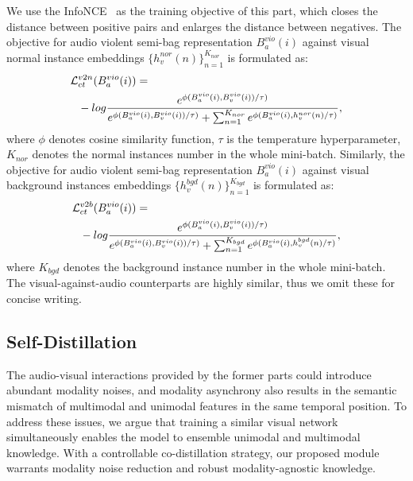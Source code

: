 \documentclass[sigconf]{acmart}
\begin{document}
We use the InfoNCE~\cite{van2018representation} as the training objective of this part, which closes the distance between positive pairs and enlarges the distance between negatives. The objective for audio violent semi-bag representation $B_a^{vio}(i)$ against visual normal instance embeddings $\{h_v^{nor}(n)\}_{n=1}^{K_{nor}}$ is formulated as:
\begin{equation}
\begin{split}
\small
    \mathcal{L}&_{ct}^{v2n}(B_a^{vio}(i)) = \\&-log \frac{e^{\phi(B_a^{vio}(i), B_v^{vio}(i))/\tau)}}{e^{\phi(B_a^{vio}(i), B_v^{vio}(i))/\tau)}+\sum_{n=1}^{K_{nor}}e^{\phi(B_a^{vio}(i), h_v^{nor}(n)/\tau)}},
\end{split}
\end{equation}
where $\phi$ denotes cosine similarity function, $\tau$ is the temperature hyperparameter, $K_{nor}$ denotes the normal instances number in the whole mini-batch. Similarly, the objective for audio violent semi-bag representation $B_a^{vio}(i)$ against visual background instances embeddings $\{h_v^{bgd}(n)\}_{n=1}^{K_{bgd}}$ is formulated as:
\begin{equation}
\begin{split}
\small
    \mathcal{L}&_{ct}^{v2b}(B_a^{vio}(i)) = \\&-log \frac{e^{\phi(B_a^{vio}(i), B_v^{vio}(i))/\tau)}}{e^{\phi(B_a^{vio}(i), B_v^{vio}(i))/\tau)}+\sum_{n=1}^{K_{bgd}}e^{\phi(B_a^{vio}(i), h_v^{bgd}(n)/\tau)}},
\end{split}
\end{equation}
where $K_{bgd}$ denotes the background instance number in the whole mini-batch. The visual-against-audio counterparts are highly similar, thus we omit these for concise writing.

\subsection{Self-Distillation}
The audio-visual interactions provided by the former parts could introduce abundant modality noises, and modality asynchrony also results in the semantic mismatch of multimodal and unimodal features in the same temporal position. To address these issues, we argue that training a similar visual network simultaneously enables the model to ensemble unimodal and multimodal knowledge. With a controllable co-distillation strategy, our proposed module warrants modality noise reduction and robust modality-agnostic knowledge.
\end{document}
